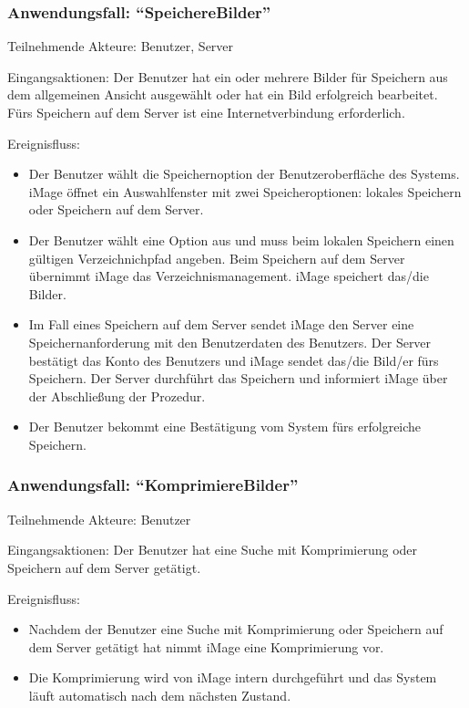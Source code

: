 \documentclass[parskip=full]{scrartcl}
\begin{document}
\subsubsection{Anwendungsfall: "`SpeichereBilder"'}

Teilnehmende Akteure: Benutzer, Server

Eingangsaktionen: Der Benutzer hat ein oder mehrere Bilder für Speichern aus dem allgemeinen Ansicht ausgewählt oder hat ein Bild erfolgreich bearbeitet. Fürs Speichern auf dem Server ist eine Internetverbindung erforderlich.

Ereignisfluss:

\begin{itemize}[nosep]
\item Der Benutzer wählt die Speichernoption der Benutzeroberfläche des Systems. iMage öffnet ein Auswahlfenster mit zwei Speicheroptionen: lokales Speichern oder Speichern auf dem Server.
\item Der Benutzer wählt eine Option aus und muss beim lokalen Speichern einen gültigen Verzeichnichpfad angeben. Beim Speichern auf dem Server übernimmt iMage das Verzeichnismanagement. iMage speichert das/die Bilder.
\item Im Fall eines Speichern auf dem Server sendet iMage den Server eine Speichernanforderung mit den Benutzerdaten des Benutzers. Der Server bestätigt das Konto des Benutzers und iMage sendet das/die Bild/er fürs Speichern. Der Server durchführt das Speichern und informiert iMage über der Abschließung der Prozedur.
\item Der Benutzer bekommt eine Bestätigung vom System fürs erfolgreiche Speichern.
\end{itemize}

\subsubsection{Anwendungsfall: "`KomprimiereBilder"'}

Teilnehmende Akteure: Benutzer

Eingangsaktionen: Der Benutzer hat eine Suche mit Komprimierung oder Speichern auf dem Server getätigt.

Ereignisfluss:

\begin{itemize}[nosep]
\item Nachdem der Benutzer eine Suche mit Komprimierung oder Speichern auf dem Server getätigt hat nimmt iMage eine Komprimierung vor.
\item Die Komprimierung wird von iMage intern durchgeführt und das System läuft automatisch nach dem nächsten Zustand.
\end{itemize}

%
%
\printnoidxglossaries
\end{document}
